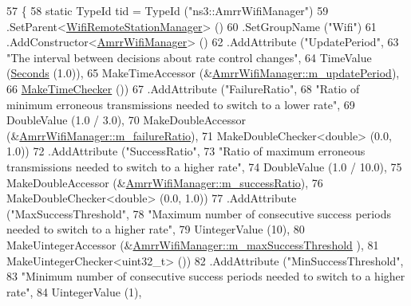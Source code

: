 \begin{DoxyCode}
57 \{
58   \textcolor{keyword}{static} TypeId tid = TypeId (\textcolor{stringliteral}{"ns3::AmrrWifiManager"})
59     .SetParent<\hyperlink{classns3_1_1WifiRemoteStationManager_a78524840f5900e1937e8e2d6df48954d}{WifiRemoteStationManager}> ()
60     .SetGroupName (\textcolor{stringliteral}{"Wifi"})
61     .AddConstructor<\hyperlink{classns3_1_1AmrrWifiManager_af0b96ccf9682bccd9e0108c6fb1e26bb}{AmrrWifiManager}> ()
62     .AddAttribute (\textcolor{stringliteral}{"UpdatePeriod"},
63                    \textcolor{stringliteral}{"The interval between decisions about rate control changes"},
64                    TimeValue (\hyperlink{group__timecivil_ga33c34b816f8ff6628e33d5c8e9713b9e}{Seconds} (1.0)),
65                    MakeTimeAccessor (&\hyperlink{classns3_1_1AmrrWifiManager_aa32a0ec8a3a3a68adc568c32f110abec}{AmrrWifiManager::m\_updatePeriod}),
66                    \hyperlink{group__time_ga7032965bd4afa578691d88c09e4481c1}{MakeTimeChecker} ())
67     .AddAttribute (\textcolor{stringliteral}{"FailureRatio"},
68                    \textcolor{stringliteral}{"Ratio of minimum erroneous transmissions needed to switch to a lower rate"},
69                    DoubleValue (1.0 / 3.0),
70                    MakeDoubleAccessor (&\hyperlink{classns3_1_1AmrrWifiManager_a1e77031f6aaafd34ef3eaceef572ef64}{AmrrWifiManager::m\_failureRatio}),
71                    MakeDoubleChecker<double> (0.0, 1.0))
72     .AddAttribute (\textcolor{stringliteral}{"SuccessRatio"},
73                    \textcolor{stringliteral}{"Ratio of maximum erroneous transmissions needed to switch to a higher rate"},
74                    DoubleValue (1.0 / 10.0),
75                    MakeDoubleAccessor (&\hyperlink{classns3_1_1AmrrWifiManager_af27c355d85f1a9971976a8e40b427856}{AmrrWifiManager::m\_successRatio}),
76                    MakeDoubleChecker<double> (0.0, 1.0))
77     .AddAttribute (\textcolor{stringliteral}{"MaxSuccessThreshold"},
78                    \textcolor{stringliteral}{"Maximum number of consecutive success periods needed to switch to a higher rate"},
79                    UintegerValue (10),
80                    MakeUintegerAccessor (&\hyperlink{classns3_1_1AmrrWifiManager_a76d77816378de62ab9b6d3f773490cf9}{AmrrWifiManager::m\_maxSuccessThreshold}
      ),
81                    MakeUintegerChecker<uint32\_t> ())
82     .AddAttribute (\textcolor{stringliteral}{"MinSuccessThreshold"},
83                    \textcolor{stringliteral}{"Minimum number of consecutive success periods needed to switch to a higher rate"},
84                    UintegerValue (1),

\end{DoxyCode}
